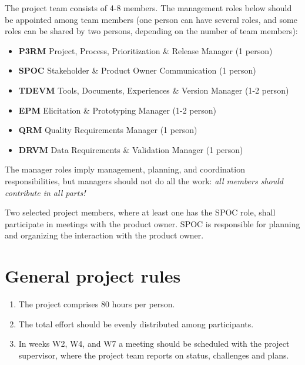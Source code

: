 \documentclass{project}
\begin{document}
The project team consists of 4-8 members. The management roles below should be appointed among team members (one person can have several roles, and some roles can be shared by two persons, depending on the number of team members):

\begin{itemize}[noitemsep]
\item \textbf{P3RM} Project, Process, Prioritization \& Release Manager (1 person)
\item \textbf{SPOC} Stakeholder \& Product Owner Communication (1 person)
\item \textbf{TDEVM} Tools, Documents, Experiences \& Version Manager (1-2 person)
\item \textbf{EPM} Elicitation \& Prototyping Manager (1-2 person)
\item \textbf{QRM} Quality Requirements Manager (1 person)
\item \textbf{DRVM} Data Requirements \& Validation Manager (1 person)
\end{itemize}

\noindent The manager roles imply management, planning, and coordination responsibilities, but managers should not do all the work: {\it all members should contribute in all parts!}

Two selected project members, where at least one has the SPOC role, shall participate in meetings with the product owner. SPOC is responsible for planning and organizing the interaction with the product owner.

\section{General project rules}
\begin{enumerate}[nolistsep]
\item The project comprises 80 hours per person.
\item The total effort should be evenly distributed among participants.
\item In weeks W2, W4, and W7 a meeting should be scheduled with the project supervisor, where the project team reports on status, challenges and plans.
\end{enumerate}

\newcommand{\ITERATIONTHREE}{
 Iteration 3 & Conference Presentation & Week 7: Wednesday 08:00\\
      & Discussant Questions & Week 7: Wednesday 15:00\\
      & Release R3 & Week 7: Sunday 23:59\\
}
\end{document}
